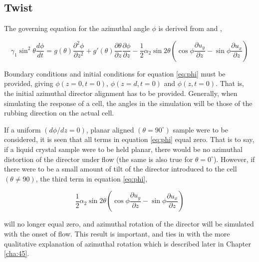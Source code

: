 \subsection{Twist}
\label{sec:phi}

The governing equation for the azimuthal angle $\phi$ is derived from \cite{Cornford2008} and \cite{Stewart2004},

\begin{equation}
\gamma_1 \sin^2\theta \frac{d\phi}{dt}=g\left(\theta\right)\frac{\partial^2\phi}{\partial z^2} + g'\left(\theta\right)\frac{\partial\theta}{\partial z}\frac{\partial\phi}{\partial z}-\frac{1}{2}\alpha_2\sin2\theta\left(\cos\phi\frac{\partial u_y}{\partial z}-\sin\phi\frac{\partial u_x}{\partial z}\right)
\label{eq:phi}
\end{equation}

\noindent Boundary conditions and initial conditions for equation \ref{eq:phi} must be provided, giving $\phi\left(z=0,t=0\right)$, $\phi\left(z=d,t=0\right)$ and $\phi\left(z,t=0\right)$. That is, the initial azimuthal director alignment has to be provided. Generally, when simulating the response of a cell, the angles in the simulation will be those of the rubbing direction on the actual cell.

If a uniform $\left(d\phi/dz=0\right)$, planar aligned $\left(\theta=90^{\circ}\right)$ sample were to be considered, it is seen that all terms in equation \ref{eq:phi} equal zero. That is to say, if a liquid crystal sample were to be held planar, there would be no azimuthal distortion of the director under flow (the same is also true for $\theta=0^{\circ}$). However, if there were to be a small amount of tilt of the director introduced to the cell $\left(\theta\neq90\right)$, the third term in equation \ref{eq:phi},

\begin{equation}
\frac{1}{2}\alpha_2\sin2\theta\left(\cos\phi\frac{\partial u_y}{\partial z}-\sin\phi\frac{\partial u_x}{\partial z}\right)
\end{equation}

\noindent will no longer equal zero, and azimuthal rotation of the director will be simulated with the onset of flow. This result is important, and ties in with the more qualitative explanation of azimuthal rotation which is described later in Chapter \ref{cha:45}.

